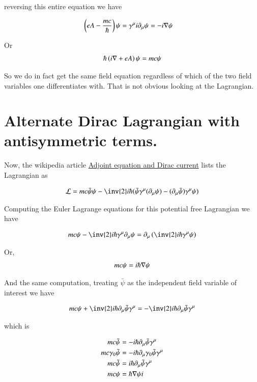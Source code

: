 \documentclass{article}
\begin{document}
reversing this entire equation we have

\begin{align*}
\left( e A - \frac{m c}{\hbar} \right) \psi &= \gamma^\mu i \partial_\mu \psi = - i \nabla \psi
\end{align*}

Or
\begin{align*}
\hbar \left( i \nabla + e A \right) \psi = m c \psi 
\end{align*}

So we do in fact get the same field equation regardless of which of the two field variables one differentiates with.  That is not obvious looking at the Lagrangian.

\section{ Alternate Dirac Lagrangian with antisymmetric terms. }

Now, the wikipedia article
\href{http://en.wikipedia.org/wiki/Dirac_equation#Adjoint_equation_and_Dirac_current}{Adjoint equation and Dirac current} lists the Lagrangian as

\begin{align*}
\LL = mc \bar{\psi}\psi - {\inv{2}i\hbar}(\bar{\psi}\gamma^\mu (\partial_\mu\psi) - (\partial_\mu\bar{\psi})\gamma^\mu \psi)
\end{align*}

Computing the Euler Lagrange equations for this potential free Lagrangian we have

\begin{align*}
m c \psi - \inv{2} i \hbar \gamma^\mu \partial_\mu \psi = \partial_\mu \left( \inv{2} i \hbar \gamma^\mu \psi \right)
\end{align*}

Or,
\begin{align*}
m c \psi = i \hbar \nabla \psi
\end{align*}

And the same computation, treating $\bar\psi$ as the independent field variable of interest we have

\begin{align*}
m c \psi + \inv{2} i \hbar \partial_\mu \bar\psi \gamma^\mu = -\inv{2} i \hbar \partial_\mu \bar\psi \gamma^\mu
\end{align*}

which is

\begin{align*}
m c \bar \psi &= - i \hbar \partial_\mu \bar\psi \gamma^\mu \\
m c \gamma_0 \tilde{\psi} &= - i \hbar \partial_\mu \gamma_0 \tilde{\psi} \gamma^\mu \\
m c \tilde{\psi} &= i \hbar \partial_\mu \tilde{\psi} \gamma^\mu \\
m c \psi &= \hbar \nabla \psi i \\
\end{align*}
\end{document}
